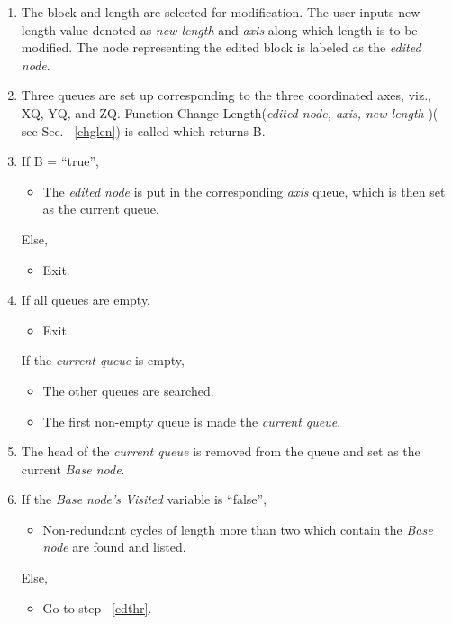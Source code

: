 	\begin{enumerate}

	\item
	The block and length are selected for modification. The user inputs
	new length value denoted as {\em new-length} and {\em axis} along which
	length is to be modified. The node representing
	the edited block is labeled as the {\em edited node}.

	\item
	Three queues are set up corresponding to the three coordinated axes, viz.,
	XQ, YQ, and ZQ.
	Function Change-Length({\em edited node, axis, new-length} )( see Sec.
	~\ref{chglen}) is called which returns B.

	\item
	If B = ``true'',
		\begin{itemize}
		\item
		The {\em edited node} is put in the corresponding {\em axis} queue, 
		which is then set as the current queue.
		\end{itemize}
	Else,
		\begin{itemize}
		\item
		Exit.
		\end{itemize}
	\item
	\label{edthr}
	If all queues are empty,
		\begin{itemize}
		\item
		Exit.
		\end{itemize}
	If the {\em current queue} is empty, 
		\begin{itemize}
		\item
	The other queues are searched.
		\item
	The first non-empty queue is made the {\em current queue}.
		\end{itemize}

	\item
	The head of the {\em current queue} is removed from the queue and set as
	the current {\em Base node}.

	\item
	\label{start}
	If the {\em Base node's Visited} variable is ``false'', 
		\begin{itemize}
		\item
		Non-redundant cycles of length more than two which contain the 
		{\em Base node} are found and listed.
		\end{itemize}
	Else,
		\begin{itemize}
		\item
		Go to step ~\ref{edthr}.
		\end{itemize}


\end{enumerate}
